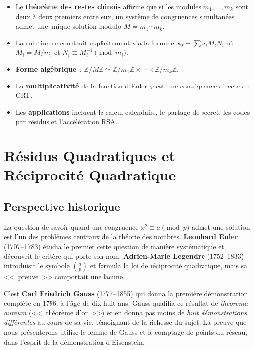 \documentclass[12pt,a4paper,openany]{book}
\theoremstyle{definition}
\theoremstyle{plain}
\theoremstyle{remark}
\newcommand{\Z}{\mathbb{Z}}
\newcommand{\legendre}[2]{\left(\frac{#1}{#2}\right)}
\begin{document}
\begin{itemize}
  \item Le \textbf{théorème des restes chinois} affirme que si les modules
        $m_1, \ldots, m_k$ sont deux à deux premiers entre eux, un système de
        congruences simultanées admet une unique solution modulo
        $M = m_1 \cdots m_k$.
  \item La solution se construit explicitement via la formule
        $x_0 = \sum a_i M_i N_i$ où $M_i = M/m_i$ et $N_i \equiv M_i^{-1} \pmod{m_i}$.
  \item \textbf{Forme algébrique}~: $\Z/M\Z \simeq \Z/m_1\Z \times \cdots \times \Z/m_k\Z$.
  \item La \textbf{multiplicativité} de la fonction d'Euler $\varphi$ est une
        conséquence directe du CRT.
  \item Les \textbf{applications} incluent le calcul calendaire, le partage de secret,
        les codes par résidus et l'accélération RSA.
\end{itemize}


\chapter{Résidus Quadratiques et Réciprocité Quadratique}
\label{chap:qr}

\section*{Perspective historique}

La question de savoir quand une congruence $x^2 \equiv a \pmod{p}$ admet une
solution est l'un des problèmes centraux de la théorie des nombres.
\textbf{Leonhard Euler} (1707--1783) étudia le premier cette question
de manière systématique et découvrit le critère qui porte son nom.
\textbf{Adrien-Marie Legendre} (1752--1833) introduisit le symbole
$\legendre{a}{p}$ et formula la loi de réciprocité quadratique, mais sa
<<~preuve~>> comportait une lacune.

C'est \textbf{Carl Friedrich Gauss} (1777--1855) qui donna la première
démonstration complète en 1796, à l'âge de dix-huit ans. Gauss qualifia ce
résultat de \emph{theorema aureum} (<<~théorème d'or~>>)
et en donna pas moins de \emph{huit démonstrations différentes} au cours de sa
vie, témoignant de la richesse du sujet. La preuve que nous présenterons utilise
le lemme de Gauss et le comptage de points du réseau, dans l'esprit de la
démonstration d'Eisenstein.
\end{document}
